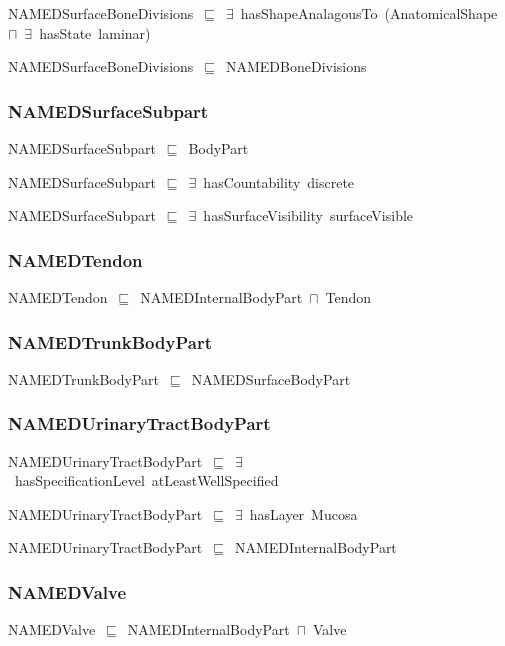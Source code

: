 \documentclass{article}
\begin{document}
NAMEDSurfaceBoneDivisions~\ensuremath{\sqsubseteq}~\ensuremath{\exists}~hasShapeAnalagousTo~(AnatomicalShape~\ensuremath{\sqcap}~\ensuremath{\exists}~hasState~laminar)~

NAMEDSurfaceBoneDivisions~\ensuremath{\sqsubseteq}~NAMEDBoneDivisions~

\subsubsection*{NAMEDSurfaceSubpart}

NAMEDSurfaceSubpart~\ensuremath{\sqsubseteq}~BodyPart~

NAMEDSurfaceSubpart~\ensuremath{\sqsubseteq}~\ensuremath{\exists}~hasCountability~discrete~

NAMEDSurfaceSubpart~\ensuremath{\sqsubseteq}~\ensuremath{\exists}~hasSurfaceVisibility~surfaceVisible~

\subsubsection*{NAMEDTendon}

NAMEDTendon~\ensuremath{\sqsubseteq}~NAMEDInternalBodyPart~\ensuremath{\sqcap}~Tendon~

\subsubsection*{NAMEDTrunkBodyPart}

NAMEDTrunkBodyPart~\ensuremath{\sqsubseteq}~NAMEDSurfaceBodyPart~

\subsubsection*{NAMEDUrinaryTractBodyPart}

NAMEDUrinaryTractBodyPart~\ensuremath{\sqsubseteq}~\ensuremath{\exists}~hasSpecificationLevel~atLeastWellSpecified~

NAMEDUrinaryTractBodyPart~\ensuremath{\sqsubseteq}~\ensuremath{\exists}~hasLayer~Mucosa~

NAMEDUrinaryTractBodyPart~\ensuremath{\sqsubseteq}~NAMEDInternalBodyPart~

\subsubsection*{NAMEDValve}

NAMEDValve~\ensuremath{\sqsubseteq}~NAMEDInternalBodyPart~\ensuremath{\sqcap}~Valve~
\end{document}
